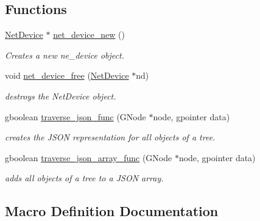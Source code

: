 \subsection*{Functions}
\begin{DoxyCompactItemize}
\item 
\hyperlink{gnode-object_8h_ab9c23d3a2ba4d9157b5ab053f61388dc}{Net\+Device} $\ast$ \hyperlink{gnode-object_8h_ae666b3f20895e60917e691c81d464235}{net\+\_\+device\+\_\+new} ()
\begin{DoxyCompactList}\small\item\em Creates a new ne\+\_\+device object. \end{DoxyCompactList}\item 
void \hyperlink{gnode-object_8h_af75477fcbe781bc0b17c75c1ad6d1606}{net\+\_\+device\+\_\+free} (\hyperlink{gnode-object_8h_ab9c23d3a2ba4d9157b5ab053f61388dc}{Net\+Device} $\ast$nd)
\begin{DoxyCompactList}\small\item\em destroys the Net\+Device object. \end{DoxyCompactList}\item 
gboolean \hyperlink{gnode-object_8h_acde5d3e413f355d1b912f0dcb9d4cdc1}{traverse\+\_\+json\+\_\+func} (G\+Node $\ast$node, gpointer data)
\begin{DoxyCompactList}\small\item\em creates the J\+S\+ON representation for all objects of a tree. \end{DoxyCompactList}\item 
gboolean \hyperlink{gnode-object_8h_a0d906716c0b2c59e34bff01153dc23d2}{traverse\+\_\+json\+\_\+array\+\_\+func} (G\+Node $\ast$node, gpointer data)
\begin{DoxyCompactList}\small\item\em adds all objects of a tree to a J\+S\+ON array. \end{DoxyCompactList}\end{DoxyCompactItemize}


\subsection{Macro Definition Documentation}
\mbox{\label{gnode-object_8h_a92eeaa07ea1bf740872e6f0fc1cf0caf}} 
